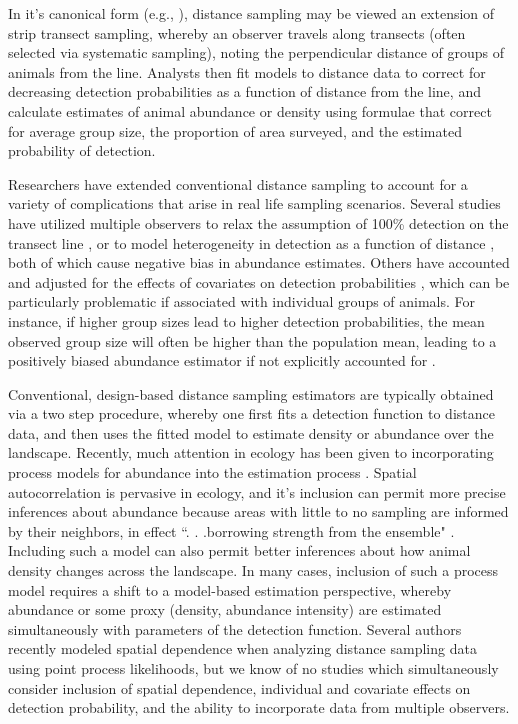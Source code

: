 \documentclass[10pt]{article}
\begin{document}
In it's canonical form (e.g., \cite{BurnhamEtAl1980}), distance sampling may be viewed an extension of strip transect sampling, whereby an observer travels along transects (often selected via systematic sampling), noting the perpendicular distance of groups of animals from the line.  Analysts then fit models to distance data to correct for decreasing detection probabilities as a function of distance from the line, and calculate estimates of animal abundance or density using formulae that correct for average group size, the proportion of area surveyed, and the estimated probability of detection.

Researchers have extended conventional distance sampling to account for a variety of complications that arise in real life sampling scenarios.  Several studies have utilized multiple observers to relax the assumption of 100\% detection on the transect line \cite{BorchersEtAl1998}, or to model heterogeneity in detection as a function of distance \cite{BorchersEtAl2006,BucklandEtAl2010}, both of which cause negative bias in abundance estimates.  Others have accounted and adjusted for the effects of covariates on detection probabilities \cite{DrummerMcdonald1987,RamseyEtAl1987,MarquesBuckland2003}, which can be particularly problematic if associated with individual groups of animals.  For instance, if higher group sizes lead to higher detection probabilities, the mean observed group size will often be higher than the population mean, leading to a positively biased abundance estimator if not explicitly accounted for \cite{DrummerMcdonald1987}.

Conventional, design-based distance sampling estimators are typically obtained via a two step procedure, whereby one first fits a detection function to distance data, and then uses the fitted model to estimate density or abundance over the landscape. Recently, much attention in ecology has been given to incorporating process models for abundance into the estimation process \cite{RoyleEtAl2004,RoyleEtAl2007}.  Spatial autocorrelation is pervasive in ecology, and it's inclusion can permit more precise inferences about abundance because areas with little to no sampling are informed by their neighbors, in effect ``. . .borrowing strength from the ensemble" \cite{Morris1983}.  Including such a model can also permit better inferences about how animal density changes across the landscape. In many cases, inclusion of such a process model requires a shift to a model-based estimation perspective, whereby abundance or some proxy (density, abundance intensity) are estimated simultaneously with parameters of the detection function. Several authors recently modeled spatial dependence when analyzing distance sampling data \cite{HedleyBuckland2004,JohnsonEtAl2010} using point process likelihoods, but we know of no studies which simultaneously consider inclusion of spatial dependence, individual and covariate effects on detection probability, and the ability to incorporate data from multiple observers.
\end{document}
